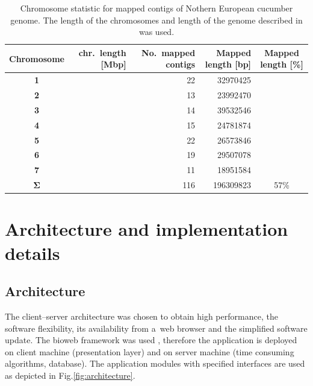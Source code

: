 \documentclass[a4paper]{spie}
\begin{document}
\begin{table}
	\centering
	\begin{tabular}{|c||r|r|r|c|} \hline
	  \textbf{Chromosome}    & chr.\ length [Mbp] & No.\ mapped contigs & Mapped length [bp] & Mapped length [\%] \\
      \hline
      \textbf{1}             &                    &  22                 &  32970425          &                    \\
      \textbf{2}             &                    &  13                 &  23992470          &                    \\
      \textbf{3}             &                    &  14                 &  39532546          &                    \\
      \textbf{4}             &                    &  15                 &  24781874          &                    \\
      \textbf{5}             &                    &  22                 &  26573846          &                    \\
      \textbf{6}             &                    &  19                 &  29507078          &                    \\
      \textbf{7}             &                    &  11                 &  18951584          &                    \\
      \hline
      $\mathbf{\Sigma}$      &                    & 116                 & 196309823          &  57\%              \\
      \hline
	\end{tabular}
	\caption{Chromosome statistic for mapped contigs of Nothern European cucumber genome.
      The length of the chromosomes and length of the genome described in \cite{chen1998reevaluation} was used.}
	\label{tab:genome_stat}
\end{table}

\section{Architecture and implementation details}

\subsection{Architecture}

The client--server architecture was chosen to obtain high performance, the software flexibility,
its availability from a~web browser and the simplified software update.
The bioweb framework was used \cite{rn:bmri2014biosoftarch},
therefore the application is deployed on client machine (presentation layer) and on server machine (time consuming algorithms, database).
The application modules with specified interfaces are used as depicted in Fig.\ref{fig:architecture}.
\end{document}
